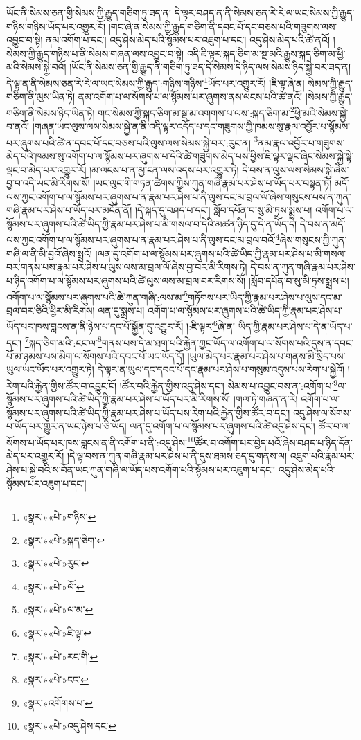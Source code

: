 ཡོང་ནི་སེམས་ཅན་གྱི་སེམས་ཀྱི་རྒྱུད་གཅིག་ཏུ་ཟད་ན། དེ་ལྟར་བཤད་ན་ནི་སེམས་ཅན་རེ་རེ་ལ་ཡང་སེམས་ཀྱི་རྒྱུད་གཉིས་གཉིས་ཡོད་པར་འགྱུར་རོ། །གང་ཞེ་ན་སེམས་ཀྱི་རྒྱུད་གཅིག་ནི་དབང་པོ་དང་བཅས་པའི་གཟུགས་ལས་འབྱུང་བ་སྟེ། ནམ་འགོག་པ་དང་། འདུ་ཤེས་མེད་པའི་སྙོམས་པར་འཇུག་པ་དང་། འདུ་ཤེས་མེད་པའི་ཚེ་ནའོ། །སེམས་ཀྱི་རྒྱུད་གཉིས་པ་ནི་སེམས་གཞན་ལས་འབྱུང་བ་སྟེ། འདི་ཇི་ལྟར་སྐད་ཅིག་མ་སྔ་མའི་རྒྱུས་སྐད་ཅིག་མ་ཕྱི་མའི་སེམས་སྐྱེ་བའོ། །ཡོང་ནི་སེམས་ཅན་གྱི་རྒྱུད་ནི་གཅིག་ཏུ་ཟད་དེ་སེམས་དེ་ཉིད་ལས་སེམས་ཉིད་སྐྱེ་བར་ཟད་ན། དེ་ལྟ་ན་ནི་སེམས་ཅན་རེ་རེ་ལ་ཡང་སེམས་ཀྱི་རྒྱུད་:གཉིས་གཉིས་\footnote{«སྣར་»«པེ་»གཉིས་}ཡོད་པར་འགྱུར་རོ། །ཇི་ལྟ་ཞེ་ན། སེམས་ཀྱི་རྒྱུད་གཅིག་ནི་ལུས་ཡིན་ཏེ། ནམ་འགོག་པ་ལ་སོགས་པ་ལ་སྙོམས་པར་ཞུགས་ནས་ལངས་པའི་ཚེ་ནའོ། །སེམས་ཀྱི་རྒྱུད་གཅིག་ནི་སེམས་ཉིད་ཡིན་ཏེ། གང་སེམས་ཀྱི་སྐད་ཅིག་མ་སྔ་མ་འགགས་པ་ལས་:སྐད་ཅིག་མ་\footnote{«སྣར་»«པེ་»སྐད་ཅིག་}ཕྱི་མའི་སེམས་སྐྱེ་བ་ནའོ། །གཞན་ཡང་ལུས་ལས་སེམས་སྐྱེ་ན་ནི་འདི་ལྟར་འདོད་པ་དང་གཟུགས་ཀྱི་ཁམས་སུ་རྣལ་འབྱོར་པ་སྙོམས་པར་ཞུགས་པའི་ཚེ་ན་དབང་པོ་དང་བཅས་པའི་ལུས་ལས་སེམས་སྐྱེ་བར་:རུང་ན། \footnote{«སྣར་»«པེ་»རུང་}ནམ་རྣལ་འབྱོར་པ་གཟུགས་མེད་པའི་ཁམས་སུ་འགོག་པ་ལ་སྙོམས་པར་ཞུགས་པ་དེའི་ཚེ་གཟུགས་མེད་པས་ཕྱིས་ཇི་ལྟར་ལྡང་ཞིང་སེམས་སྐྱེ་སྟེ་ལྡང་བ་མེད་པར་འགྱུར་རོ། །མ་ལངས་པ་ན་མྱ་ངན་ལས་འདས་པར་འགྱུར་ཏེ། དེ་བས་ན་ལུས་ལས་སེམས་སྐྱེ་ཞེས་བྱ་བ་འདི་ཡང་མི་རིགས་སོ། །ཡང་ལུང་གི་གཏན་ཚིགས་ཀྱིས་ཀུན་གཞི་རྣམ་པར་ཤེས་པ་ཡོད་པར་བསྟན་ཏེ། མདོ་ལས་ཀྱང་འགོག་པ་ལ་སྙོམས་པར་ཞུགས་པ་ན་རྣམ་པར་ཤེས་པ་ནི་ལུས་དང་མ་བྲལ་ལོ་ཞེས་གསུངས་པས་ན་ཀུན་གཞི་རྣམ་པར་ཤེས་པ་ཡོད་པར་མངོན་ནོ། །དེ་སྐད་དུ་བཤད་པ་དང་། སློབ་དཔོན་བ་སུ་མི་ཏྲས་སྨྲས་པ། འགོག་པ་ལ་སྙོམས་པར་ཞུགས་པའི་ཚེ་ཡིད་ཀྱི་རྣམ་པར་ཤེས་པ་མི་གསལ་བ་དེའི་མཚན་ཉིད་དུ་དེ་ན་ཡོད་དེ། དེ་བས་ན་མདོ་ལས་ཀྱང་འགོག་པ་ལ་སྙོམས་པར་ཞུགས་པ་ན་རྣམ་པར་ཤེས་པ་ནི་ལུས་དང་མ་བྲལ་བའོ་\footnote{«སྣར་»«པེ་»ལོ་}ཞེས་གསུངས་ཀྱི་ཀུན་གཞི་ལ་ནི་མི་བྱའོ་ཞེས་སྨྲའོ། །ལན་དུ་འགོག་པ་ལ་སྙོམས་པར་ཞུགས་པའི་ཚེ་ཡིད་ཀྱི་རྣམ་པར་ཤེས་པ་མི་གསལ་བར་གནས་པས་རྣམ་པར་ཤེས་པ་ལུས་ལས་མ་བྲལ་ལོ་ཞེས་བྱ་བར་མི་རིགས་ཏེ། དེ་བས་ན་ཀུན་གཞི་རྣམ་པར་ཤེས་པ་ཉིད་འགོག་པ་ལ་སྙོམས་པར་ཞུགས་པའི་ཚེ་ལུས་ལས་མ་བྲལ་བར་རིགས་སོ། །སློབ་དཔོན་བ་སུ་མི་ཏྲས་སྨྲས་པ། འགོག་པ་ལ་སྙོམས་པར་ཞུགས་པའི་ཚེ་ཀུན་གཞི་:ལས་མ་\footnote{«སྣར་»«པེ་»ལ་མ་}གཏོགས་པར་ཡིད་ཀྱི་རྣམ་པར་ཤེས་པ་ལུས་དང་མ་བྲལ་བར་ཅིའི་ཕྱིར་མི་རིགས། ལན་དུ་སྨྲས་པ། འགོག་པ་ལ་སྙོམས་པར་ཞུགས་པའི་ཚེ་ཡིད་ཀྱི་རྣམ་པར་ཤེས་པ་ཡོད་པར་ཁས་བླངས་ན་ནི་ཉེས་པ་དང་པོ་སྐྱོན་དུ་འགྱུར་རོ། །:ཇི་ལྟར་\footnote{«སྣར་»«པེ་»ཇི་ལྟ་}ཞེ་ན། ཡིད་ཀྱི་རྣམ་པར་ཤེས་པ་དེ་ན་ཡོད་པ་དང་། \footnote{«སྣར་»«པེ་»རང་གི་}སྐད་ཅིག་མའི་:ངང་ལ་\footnote{«སྣར་»«པེ་»ངང་}གནས་པས་དེ་མ་ཐག་པའི་རྐྱེན་ཀྱང་ཡོད་ལ་འགོག་པ་ལ་སོགས་པའི་དུས་ན་དབང་པོ་མ་ཉམས་པས་མིག་ལ་སོགས་པའི་དབང་པོ་ཡང་ཡོད་དོ། །ཡུལ་མེད་པར་རྣམ་པར་ཤེས་པ་གནས་མི་སྲིད་པས་ཡུལ་ཡང་ཡོད་པར་འགྱུར་ཏེ། དེ་ལྟར་ན་ཡུལ་དང་དབང་པོ་དང་རྣམ་པར་ཤེས་པ་གསུམ་འདུས་པས་རེག་པ་སྐྱེའོ། །རེག་པའི་རྐྱེན་གྱིས་ཚོར་བ་འབྱུང་ངོ། །ཚོར་བའི་རྐྱེན་གྱིས་འདུ་ཤེས་དང་། སེམས་པ་འབྱུང་བས་ན་:འགོག་པ་\footnote{«སྣར་»འགོགས་པ་}ལ་སྙོམས་པར་ཞུགས་པའི་ཚེ་ཡིད་ཀྱི་རྣམ་པར་ཤེས་པ་ཡོད་པར་མི་རིགས་སོ། །གལ་ཏེ་གཞན་ན་རེ། འགོག་པ་ལ་སྙོམས་པར་ཞུགས་པའི་ཚེ་ཡིད་ཀྱི་རྣམ་པར་ཤེས་པ་ཡོད་པས་རེག་པའི་རྐྱེན་གྱིས་ཚོར་བ་དང་། འདུ་ཤེས་ལ་སོགས་པ་ཡོད་པར་གྱུར་ན་ཡང་ཉེས་པ་ཅི་ཡོད། ལན་དུ་འགོག་པ་ལ་སྙོམས་པར་ཞུགས་པའི་ཚེ་འདུ་ཤེས་དང་། ཚོར་བ་ལ་སོགས་པ་ཡོད་པར་ཁས་བླངས་ན་ནི་འགོག་པ་ནི་:འདུ་ཤེས་\footnote{«སྣར་»«པེ་»འདུ་ཤེས་དང་}ཚོར་བ་འགོག་པར་བྱེད་པའོ་ཞེས་བཤད་པ་ཉིད་དོན་མེད་པར་འགྱུར་རོ། །དེ་ལྟ་བས་ན་ཀུན་གཞི་རྣམ་པར་ཤེས་པ་ནི་དུས་ཐམས་ཅད་དུ་གནས་ལ། འཇུག་པའི་རྣམ་པར་ཤེས་པ་སྐྱེ་བའི་ས་བོན་ཡང་ཀུན་གཞི་ལ་ཡོད་པས་འགོག་པའི་སྙོམས་པར་འཇུག་པ་དང་། འདུ་ཤེས་མེད་པའི་སྙོམས་པར་འཇུག་པ་དང་། 